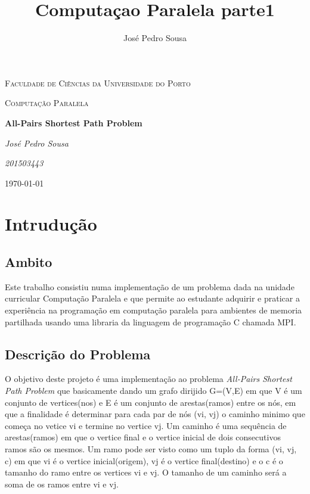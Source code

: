 \documentclass[12pt,a4paper]{article}
\author{José Pedro Sousa}
\title{Computaçao Paralela parte1}
\begin{document}
\begin{titlepage}
	\centering
	{\scshape\LARGE Faculdade de Ciências da Universidade do Porto \par}
	\vspace{1cm}
	{\scshape\Large Computação Paralela\par}
	\vspace{1.5cm}
	{\huge\bfseries All-Pairs Shortest Path Problem\par}
	\vspace{2cm}
	{\Large\itshape José Pedro Sousa\par}
	{\Large\itshape 201503443\par}
	\vfill

	{\large \today\par}
\end{titlepage}
\section{Intrudução}
\subsection{Ambito}
    Este trabalho consistiu numa implementação de um problema dada na unidade curricular Computação Paralela  e que permite ao estudante adquirir e praticar a experiência na programação em computação paralela para ambientes de memoria partilhada usando uma libraria da linguagem de programação C chamada MPI.\par

    \subsection{Descrição do Problema}
        O objetivo deste projeto é uma implementação ao problema \textit{All-Pairs Shortest Path Problem} que basicamente dando um grafo dirijido G=(V,E) em que V  é um conjunto de vertices(nos) e E é um conjunto de arestas(ramos) entre os nós, em que a finalidade é determinar para cada par de nós (vi, vj) o caminho minimo que começa no vetice vi e termine no vertice vj. Um caminho é uma sequência de arestas(ramos) em que o vertice final e o vertice inicial de dois consecutivos ramos são os mesmos. Um ramo pode ser visto como um tuplo da forma (vi, vj, c) em que vi é o vertice inicial(origem), vj é o vertice final(destino) e o c é o tamanho do ramo entre os vertices vi e vj. O tamanho de um caminho será a soma de os ramos entre vi e vj.
        
\end{document}
